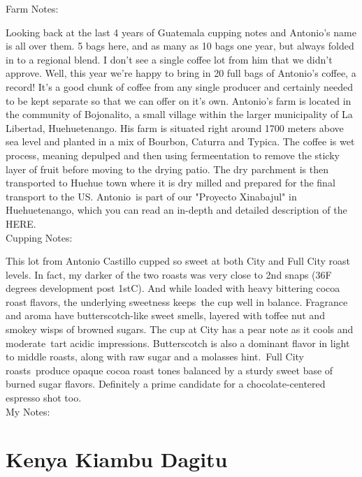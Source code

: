 \documentclass[10pt,twoside,footinclude=true,headinclude=true]{scrbook} %
\newlength{\mysize}
\newcommand{\myfontsize}[1]{
  \setlength{\mysize}{#1pt}
  \fontsize{\mysize}{1.2\mysize}
  \selectfont
}
\begin{document}
\newpage
\vspace*{-2.2em}
\raggedright
\normalsize
Farm Notes: \\
\myfontsize{8}
Looking back at the last 4 years of Guatemala cupping notes and Antonio's name is all over them. 5 bags here, and as many as 10 bags one year, but always folded in to a regional blend. I don't see a single coffee lot from him that we didn't approve. Well, this year we're happy to bring in 20 full bags of Antonio's coffee, a record! It's a good chunk of coffee from any single producer and certainly needed to be kept separate so that we can offer on it's own. Antonio's farm is located in the community of Bojonalito, a small village within the larger municipality of La Libertad, Huehuetenango. His farm is situated right around 1700 meters above sea level and planted in a mix of Bourbon, Caturra and Typica. The coffee is wet process, meaning depulped and then using fermeentation to remove the sticky layer of fruit before moving to the drying patio. The dry parchment is then transported to Huehue town where it is dry milled and prepared for the final transport to the US. Antonio is part of our "Proyecto Xinabajul" in Huehuetenango, which you can read an in-depth and detailed description of the HERE. \\
\medskip
\normalsize
Cupping Notes: \\
\myfontsize{8}
This lot from Antonio Castillo cupped so sweet at both City and Full City roast levels. In fact, my darker of the two roasts was very close to 2nd snaps (36F degrees development post 1stC). And while loaded with heavy bittering cocoa roast flavors, the underlying sweetness keeps the cup well in balance. Fragrance and aroma have butterscotch-like sweet smells, layered with toffee nut and smokey wisps of browned sugars. The cup at City has a pear note as it cools and moderate tart acidic impressions. Butterscotch is also a dominant flavor in light to middle roasts, along with raw sugar and a molasses hint. Full City roasts produce opaque cocoa roast tones balanced by a sturdy sweet base of burned sugar flavors. Definitely a prime candidate for a chocolate-centered espresso shot too. \\
\medskip
\normalsize
My Notes:


\chapter*{Kenya Kiambu Dagitu}
 
\end{document}
